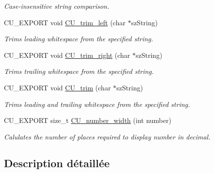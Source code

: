 \begin{DoxyCompactItemize}
\begin{DoxyCompactList}\small\item\em Case-\/insensitive string comparison. \end{DoxyCompactList}\item 
C\-U\-\_\-\-E\-X\-P\-O\-R\-T void \hyperlink{group__Framework_gade303bc81f692aa882189eb14484be8f}{C\-U\-\_\-trim\-\_\-left} (char $\ast$sz\-String)
\begin{DoxyCompactList}\small\item\em Trims leading whitespace from the specified string. \end{DoxyCompactList}\item 
C\-U\-\_\-\-E\-X\-P\-O\-R\-T void \hyperlink{group__Framework_ga728a4e98bd73682b97cede1429547d6d}{C\-U\-\_\-trim\-\_\-right} (char $\ast$sz\-String)
\begin{DoxyCompactList}\small\item\em Trims trailing whitespace from the specified string. \end{DoxyCompactList}\item 
C\-U\-\_\-\-E\-X\-P\-O\-R\-T void \hyperlink{group__Framework_gab4f507101595640f759647d13f0e0a00}{C\-U\-\_\-trim} (char $\ast$sz\-String)
\begin{DoxyCompactList}\small\item\em Trims leading and trailing whitespace from the specified string. \end{DoxyCompactList}\item 
\hypertarget{group__Framework_ga645f6e889b0c3be2f6e0217f9bfef092}{C\-U\-\_\-\-E\-X\-P\-O\-R\-T size\-\_\-t \hyperlink{group__Framework_ga645f6e889b0c3be2f6e0217f9bfef092}{C\-U\-\_\-number\-\_\-width} (int number)}\label{group__Framework_ga645f6e889b0c3be2f6e0217f9bfef092}

\begin{DoxyCompactList}\small\item\em Calulates the number of places required to display number in decimal. \end{DoxyCompactList}\end{DoxyCompactItemize}


\subsection{Description détaillée}


